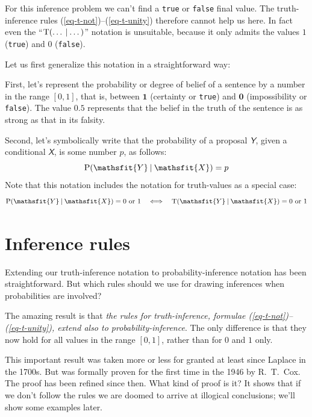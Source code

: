 \documentclass[
  a4paper,
  DIV=11,
  numbers=noendperiod,
  oneside]{scrreprt}
\begin{document}
For this inference problem we can't find a \texttt{true} or
\texttt{false} final value. The truth-inference rules
(\ref{eq-t-not})--(\ref{eq-t-unity}) therefore cannot help us here. In
fact even the
{``\(\mathrm{T}(\dotso \nonscript\:\vert\nonscript\:\mathopen{} \dotso)\)''}
notation is unsuitable, because it only admits the values \(1\)
(\texttt{true}) and \(0\) (\texttt{false}).

Let us first generalize this notation in a straightforward way:

First, let's represent the probability or degree of belief of a sentence
by a number in the range {\([0,1]\),} that is, between \(\mathbf{1}\)
(certainty or \texttt{true}) and \(\mathbf{0}\) (impossibility or
\texttt{false}). The value \(0.5\) represents that the belief in the
truth of the sentence is as strong as that in its falsity.

Second, let's symbolically write that the probability of a proposal
\(\mathsfit{Y}\), given a conditional \(\mathsfit{X}\), is some number
\(p\), as follows: \[
\mathrm{P}(\mathsfit{Y}\nonscript\:\vert\nonscript\:\mathopen{} \mathsfit{X}) = p
\] Note that this notation includes the notation for truth-values as a
special case: \[
\mathrm{P}(\mathsfit{Y}\nonscript\:\vert\nonscript\:\mathopen{} \mathsfit{X}) = 0\text{ or }1
\quad\Longleftrightarrow\quad
\mathrm{T}(\mathsfit{Y}\nonscript\:\vert\nonscript\:\mathopen{} \mathsfit{X}) = 0\text{ or }1
\]

\hypertarget{sec-fundamental}{%
\section{Inference rules}\label{sec-fundamental}}

Extending our truth-inference notation to probability-inference notation
has been straightforward. But which rules should we use for drawing
inferences when probabilities are involved?

The amazing result is that \emph{the rules for truth-inference, formulae
(\ref{eq-t-not})--(\ref{eq-t-unity}), extend also to
probability-inference}. The only difference is that they now hold for
all values in the range \([0,1]\), rather than for \(0\) and \(1\) only.

This important result was taken more or less for granted at least since
Laplace in the 1700s. But was formally proven for the first time in the
1946 by R.~T.~Cox. The proof has been refined since then. What kind of
proof is it? It shows that if we don't follow the rules we are doomed to
arrive at illogical conclusions; we'll show some examples later.
\end{document}
